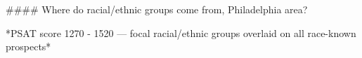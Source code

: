 #### Where do racial/ethnic groups come from, Philadelphia area?

*PSAT score 1270 - 1520 — focal racial/ethnic groups overlaid on all race-known prospects*
